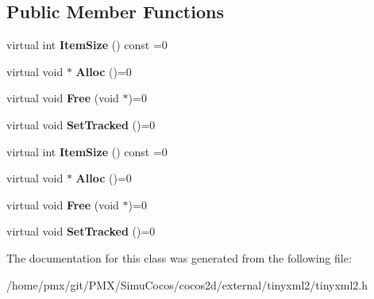\subsection*{Public Member Functions}
\begin{DoxyCompactItemize}
\item 
\mbox{\label{classtinyxml2_1_1MemPool_a0c518d49e3a94bde566f61e13b7240bb}} 
virtual int {\bfseries Item\+Size} () const =0
\item 
\mbox{\label{classtinyxml2_1_1MemPool_a4f977b5fed752c0bbfe5295f469d6449}} 
virtual void $\ast$ {\bfseries Alloc} ()=0
\item 
\mbox{\label{classtinyxml2_1_1MemPool_a49e3bfac2cba2ebd6776b31e571f64f7}} 
virtual void {\bfseries Free} (void $\ast$)=0
\item 
\mbox{\label{classtinyxml2_1_1MemPool_ac5804dd1387b2e4de5eef710076a0db1}} 
virtual void {\bfseries Set\+Tracked} ()=0
\item 
\mbox{\label{classtinyxml2_1_1MemPool_a0c518d49e3a94bde566f61e13b7240bb}} 
virtual int {\bfseries Item\+Size} () const =0
\item 
\mbox{\label{classtinyxml2_1_1MemPool_a4f977b5fed752c0bbfe5295f469d6449}} 
virtual void $\ast$ {\bfseries Alloc} ()=0
\item 
\mbox{\label{classtinyxml2_1_1MemPool_a49e3bfac2cba2ebd6776b31e571f64f7}} 
virtual void {\bfseries Free} (void $\ast$)=0
\item 
\mbox{\label{classtinyxml2_1_1MemPool_ac5804dd1387b2e4de5eef710076a0db1}} 
virtual void {\bfseries Set\+Tracked} ()=0
\end{DoxyCompactItemize}


The documentation for this class was generated from the following file\+:\begin{DoxyCompactItemize}
\item 
/home/pmx/git/\+P\+M\+X/\+Simu\+Cocos/cocos2d/external/tinyxml2/tinyxml2.\+h\end{DoxyCompactItemize}
